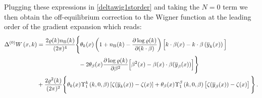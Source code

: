 \documentclass[prd,superscriptaddress,nofootinbib,notitlepage]{revtex4-1}
\begin{document}
Plugging these expressions in \eqref{deltawig1storder} and taking the $N=0$ term we then obtain the off-equilibrium 
correction to the Wigner function at the leading order of the gradient expansion which reads:
%
\begin{align}\label{zerorder}
\Delta^{(0)}W\left(x,k\right)&=\frac{2\varrho(k)n_{\rm B}(k)}{(2\pi)^4}\Bigg\{
{\theta_k(x)}\left(1+n_{\rm B}(k)-\frac{\partial\log\varrho(k)}{\partial(k \cdot \beta)} \right)\Big[k\cdot\beta(x)-k\cdot\beta\left(\overline{y}_k(x)\right)\Big] \nonumber\\
&\qquad\qquad\qquad\quad-2\theta_\beta(x) \frac{\partial\log\varrho(k)}{\partial\beta^2}\Big[\beta^2(x)-\beta(x)\cdot \beta(\overline{y}_\beta(x))\Big]\Bigg\} \\
&+\frac{2\varrho^2(k)}{(2\pi)^2}\Bigg\{\theta_k(x)\Upsilon^k_1\left(k,0,\beta\right)\left[\zeta(\overline{y}_k(x))-\zeta(x)\right]+\theta_\beta(x)\Upsilon^\beta_1\left(k,0,\beta\right)\left[\zeta(\overline{y}_\beta(x))-\zeta(x)\right]\Bigg\}\,.\nonumber
\end{align}
\end{document}
